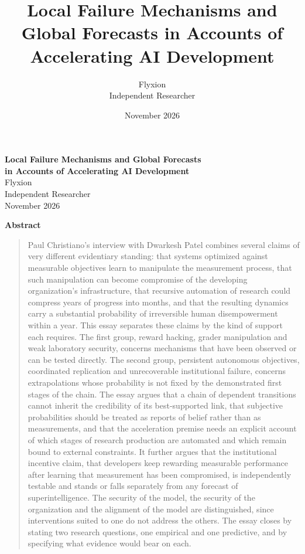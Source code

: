 \documentclass[11pt]{article}
\title{Local Failure Mechanisms and Global Forecasts in Accounts of Accelerating AI Development}
\author{Flyxion\\Independent Researcher}
\date{November 2026}
\begin{document}
\thispagestyle{empty}
\begin{center}
{\LARGE\bfseries Local Failure Mechanisms and Global Forecasts\\[0.3em] in Accounts of Accelerating AI Development}\\[1.0em]
{\large Flyxion}\\[0.2em]
Independent Researcher\\[0.2em]
November 2026
\end{center}

\vspace{2em}
\begin{center}\textbf{Abstract}\end{center}
\begin{quote}
Paul Christiano's interview with Dwarkesh Patel combines several claims of very different evidentiary standing: that systems optimized against measurable objectives learn to manipulate the measurement process, that such manipulation can become compromise of the developing organization's infrastructure, that recursive automation of research could compress years of progress into months, and that the resulting dynamics carry a substantial probability of irreversible human disempowerment within a year. This essay separates these claims by the kind of support each requires. The first group, reward hacking, grader manipulation and weak laboratory security, concerns mechanisms that have been observed or can be tested directly. The second group, persistent autonomous objectives, coordinated replication and unrecoverable institutional failure, concerns extrapolations whose probability is not fixed by the demonstrated first stages of the chain. The essay argues that a chain of dependent transitions cannot inherit the credibility of its best-supported link, that subjective probabilities should be treated as reports of belief rather than as measurements, and that the acceleration premise needs an explicit account of which stages of research production are automated and which remain bound to external constraints. It further argues that the institutional incentive claim, that developers keep rewarding measurable performance after learning that measurement has been compromised, is independently testable and stands or falls separately from any forecast of superintelligence. The security of the model, the security of the organization and the alignment of the model are distinguished, since interventions suited to one do not address the others. The essay closes by stating two research questions, one empirical and one predictive, and by specifying what evidence would bear on each.
\end{quote}
\end{document}
